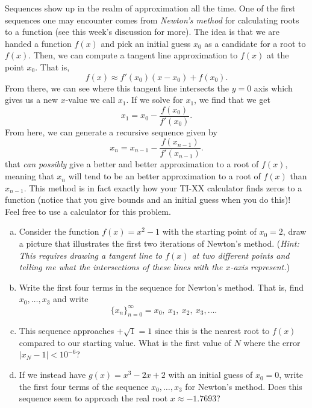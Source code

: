 \begin{problem}
Sequences show up in the realm of approximation all the time.  One of the first sequences one may encounter comes from \emph{Newton's method} for calculating roots to a function (see this week's discussion for more).  The idea is that we are handed a function $f(x)$ and pick an initial guess $x_0$ as a candidate for a root to $f(x)$. Then, we can compute a tangent line approximation to $f(x)$ at the point $x_0$. That is,
\[
f(x)\approx f'(x_0)(x-x_0)+f(x_0).
\]
From there, we can see where this tangent line intersects the $y=0$ axis which gives us a new $x$-value we call $x_1$.  If we solve for $x_1$, we find that we get
\[
x_1 = x_0 -\frac{f(x_0)}{f'(x_0)}.
\]
From here, we can generate a recursive sequence given by
\[
x_{n}=x_{n-1}-\frac{f(x_{n-1})}{f'(x_{n-1})}.
\]
that \emph{can possibly} give a better and better approximation to a root of $f(x)$, meaning that $x_n$ will tend to be an better approximation to a root of $f(x)$ than $x_{n-1}$. This method is in fact exactly how your TI-XX calculator finds zeros to a function (notice that you give bounds and an initial guess when you do this)!\\

\noindent Feel free to use a calculator for this problem.
\begin{enumerate}[(a)]
    \item Consider the function $f(x)=x^2-1$ with the starting point of $x_0=2$, draw a picture that illustrates the first two iterations of Newton's method. (\emph{Hint: This requires drawing a tangent line to $f(x)$ at two different points and telling me what the intersections of these lines with the $x$-axis represent.})
    \item Write the first four terms in the sequence for Newton's method. That is, find $x_0,\dots,x_3$ and write
    \[
    \{x_n\}_{n=0}^\infty = x_0,~x_1,~x_2,~x_3,\dots.
    \]
    \item This sequence approaches $+\sqrt{1}=1$ since this is the nearest root to $f(x)$ compared to our starting value. What is the first value of $N$ where the error $|x_N-1|<10^{-6}$?
    \item If we instead have $g(x)=x^3-2x+2$ with an initial guess of $x_0=0$, write the first four terms of the sequence $x_0,\dots,x_3$ for Newton's method. Does this sequence seem to approach the real root $x\approx -1.7693$?
\end{enumerate}
\end{problem}






